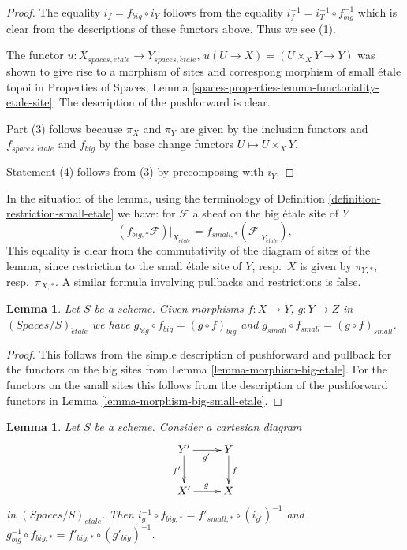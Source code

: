 \documentclass{stacks-project}
\theoremstyle{plain}
\newtheorem{lemma}[subsection]{Lemma}
\theoremstyle{definition}
\theoremstyle{remark}
\numberwithin{equation}{subsection}
\def\etale{{\acute{e}tale}}
\begin{document}
\begin{proof}
The equality $i_f = f_{big} \circ i_Y$ follows from the
equality $i_f^{-1} = i_T^{-1} \circ f_{big}^{-1}$ which is
clear from the descriptions of these functors above.
Thus we see (1).

\medskip\noindent
The functor $u : X_{spaces, \etale} \to Y_{spaces, \etale}$,
$u(U \to X) = (U \times_X Y \to Y)$ was shown to give
rise to a morphism of sites and correspong morphism of
small \'etale topoi in
Properties of Spaces, Lemma
\ref{spaces-properties-lemma-functoriality-etale-site}. The description
of the pushforward is clear.

\medskip\noindent
Part (3) follows because $\pi_X$ and $\pi_Y$ are given by the
inclusion functors and $f_{spaces, \etale}$ and $f_{big}$ by the
base change functors $U \mapsto U \times_X Y$.

\medskip\noindent
Statement (4) follows from (3) by precomposing with $i_Y$.
\end{proof}

\noindent
In the situation of the lemma, using the terminology of
Definition \ref{definition-restriction-small-etale}
we have: for $\mathcal{F}$ a sheaf on the big \'etale site of $Y$
$$
(f_{big, *}\mathcal{F})|_{X_\etale} =
f_{small, *}(\mathcal{F}|_{Y_\etale}),
$$
This equality is clear from the commutativity of the diagram of
sites of the lemma, since restriction to the small \'etale site of
$Y$, resp.\ $X$ is given by $\pi_{Y, *}$, resp.\ $\pi_{X, *}$. A similar
formula involving pullbacks and restrictions is false.

\begin{lemma}
\label{lemma-composition-etale}
Let $S$ be a scheme. Given morphisms $f : X \to Y$, $g : Y \to Z$
in $(\textit{Spaces}/S)_\etale$ we have
$g_{big} \circ f_{big} = (g \circ f)_{big}$ and
$g_{small} \circ f_{small} = (g \circ f)_{small}$.
\end{lemma}

\begin{proof}
This follows from the simple description of pushforward
and pullback for the functors on the big sites from
Lemma \ref{lemma-morphism-big-etale}. For the functors
on the small sites this follows from the description of
the pushforward functors in Lemma \ref{lemma-morphism-big-small-etale}.
\end{proof}

\begin{lemma}
\label{lemma-morphism-big-small-cartesian-diagram-etale}
Let $S$ be a scheme. Consider a cartesian diagram
$$
\xymatrix{
Y' \ar[r]_{g'} \ar[d]_{f'} & Y \ar[d]^f \\
X' \ar[r]^g & X
}
$$
in $(\textit{Spaces}/S)_\etale$. Then
$i_g^{-1} \circ f_{big, *} = f'_{small, *} \circ (i_{g'})^{-1}$
and $g_{big}^{-1} \circ f_{big, *} = f'_{big, *} \circ (g'_{big})^{-1}$.
\end{lemma}
\end{document}
